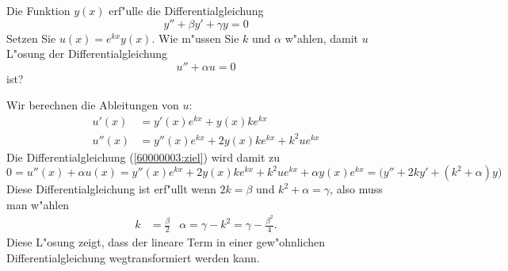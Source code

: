 Die Funktion $y(x)$ erf"ulle die Differentialgleichung
\begin{equation}
y''+\beta y' + \gamma y=0
\label{60000003:vorgabe}
\end{equation}
Setzen Sie $u(x)=e^{k x}y(x)$.
Wie m"ussen Sie $k$ und $\alpha$ w"ahlen, damit $u$ L"osung der
Differentialgleichung
\begin{equation}
u''+\alpha u=0
\label{60000003:ziel}
\end{equation}
ist?

\begin{loesung}
Wir berechnen die Ableitungen von $u$:
\begin{align*}
u'(x)&=y'(x)e^{kx}+y(x)ke^{kx}\\
u''(x)&=y''(x)e^{kx}+2y(x)ke^{kx}+k^2ue^{kx}
\end{align*}
Die Differentialgleichung  (\ref{60000003:ziel}) wird damit
zu
\[
0
=
u''(x)+\alpha u(x)
=
y''(x)e^{kx}+2y(x)ke^{kx}+k^2ue^{kx}
+ \alpha y(x)e^{kx}
=
\bigl(
y''+2k y' +(k^2+\alpha)y
\bigr)
\]
Diese Differentialgleichung ist erf"ullt wenn $2k=\beta$ und
$k^2+\alpha=\gamma$, also muss man w"ahlen
\[
\begin{aligned}
k&=\frac{\beta}2
&
\alpha=\gamma-k^2=\gamma-\frac{\beta^2}4.
\end{aligned}
\]
Diese L"osung zeigt, dass der lineare Term in einer gew"ohnlichen
Differentialgleichung wegtransformiert werden kann.
\end{loesung}

